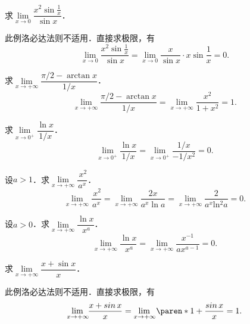 \begin{example}
  \label{eg:lhospital00ce}
  求\(\lim\limits_{x\to0} \dfrac{x^2 \sin\frac1x}{\sin x}\)．

  \begin{remark}
    此例洛必达法则不适用．直接求极限，有
    \begin{equation*}
      \lim_{x\to0} \frac{x^2 \sin\frac1x}{\sin x}
      = \lim_{x\to0} \frac{x}{\sin x} \cdot x \sin\frac1x
      = 0.
    \end{equation*}
  \end{remark}
\end{example}

\begin{example*}
  求\(\!\lim\limits_{x\to+\infty\!} \!\dfrac{\pi/2 - \arctan x}{1/x}\)．
  \begin{equation*}
    \lim_{x\to+\infty\!} \!\frac{\pi/2 - \arctan x}{1/x}
    = \lim_{x\to+\infty} \frac{x^2}{1+x^2}
    = 1.
  \end{equation*}
\end{example*}

\begin{example*}
  求\(\!\lim\limits_{x\to0^+\!} \dfrac{\ln x}{1/x}\)．
  \begin{equation*}
    \lim_{x\to0^+\!} \frac{\ln x}{1/x}
    = \lim_{x\to0^+\!} \frac{1/x}{-1/x^2}
    = 0.
  \end{equation*}
\end{example*}

\begin{example*}
  设\(a > 1\)．求\(\!\lim\limits_{x\to+\infty\!} \dfrac{\,x^2}{a^x}\)．
  \begin{equation*}
    \lim_{x\to+\infty\!} \frac{\,x^2}{a^x}
    = \lim_{x\to+\infty\!} \frac{2x}{a^x \ln a}
    = \lim_{x\to+\infty\!} \frac{2}{a^x \operatorname{ln^2} a}
    = 0.
  \end{equation*}
\end{example*}

\begin{example*}
  设\(a > 0\)．求\(\!\lim\limits_{x\to+\infty\!} \dfrac{\ln x}{\,x^a}\)．
  \begin{equation*}
    \lim_{x\to+\infty\!} \frac{\ln x}{\,x^a}
    = \lim_{x\to+\infty\!} \frac{x^{-1}}{ax^{a-1}}
    = 0.
  \end{equation*}
\end{example*}

\begin{example}
  \label{eg:lhospitalinfinfce}
  求\(\!\lim\limits_{x\to+\infty\!} \!\dfrac{x+\sin x}{x}\)．

  \begin{remark}
    此例洛必达法则不适用．直接求极限，有
    \begin{equation*}
      \lim_{x\to+\infty\!} \!\frac{x+\sin x}{x} = \lim_{x\to+\infty\!} \paren*{1 + \frac{\sin x}{x}} = 1.
    \end{equation*}
  \end{remark}
\end{example}

